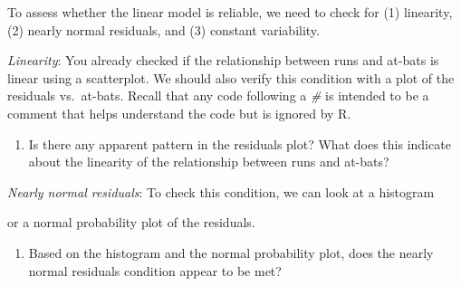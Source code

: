 \documentclass[]{book}
\newenvironment{Shaded}{\begin{snugshade}}{\end{snugshade}}
\newcommand{\KeywordTok}[1]{\textcolor[rgb]{0.13,0.29,0.53}{\textbf{{#1}}}}
\newcommand{\DataTypeTok}[1]{\textcolor[rgb]{0.13,0.29,0.53}{{#1}}}
\newcommand{\DecValTok}[1]{\textcolor[rgb]{0.00,0.00,0.81}{{#1}}}
\newcommand{\StringTok}[1]{\textcolor[rgb]{0.31,0.60,0.02}{{#1}}}
\newcommand{\CommentTok}[1]{\textcolor[rgb]{0.56,0.35,0.01}{\textit{{#1}}}}
\newcommand{\NormalTok}[1]{{#1}}
\providecommand{\tightlist}{%
  \setlength{\itemsep}{0pt}\setlength{\parskip}{0pt}}
\theoremstyle{definition}
\theoremstyle{definition}
\theoremstyle{remark}
\begin{document}
To assess whether the linear model is reliable, we need to check for (1)
linearity, (2) nearly normal residuals, and (3) constant variability.

\emph{Linearity}: You already checked if the relationship between runs
and at-bats is linear using a scatterplot. We should also verify this
condition with a plot of the residuals vs.~at-bats. Recall that any code
following a \emph{\#} is intended to be a comment that helps understand
the code but is ignored by R.

\begin{Shaded}
\end{Shaded}

\begin{enumerate}
\def\labelenumi{\arabic{enumi}.}
\setcounter{enumi}{5}
\tightlist
\item
  Is there any apparent pattern in the residuals plot? What does this
  indicate about the linearity of the relationship between runs and
  at-bats?
\end{enumerate}

\emph{Nearly normal residuals}: To check this condition, we can look at
a histogram

\begin{Shaded}
\end{Shaded}

or a normal probability plot of the residuals.

\begin{Shaded}
\end{Shaded}

\begin{enumerate}
\def\labelenumi{\arabic{enumi}.}
\setcounter{enumi}{6}
\tightlist
\item
  Based on the histogram and the normal probability plot, does the
  nearly normal residuals condition appear to be met?
\end{enumerate}
\end{document}
